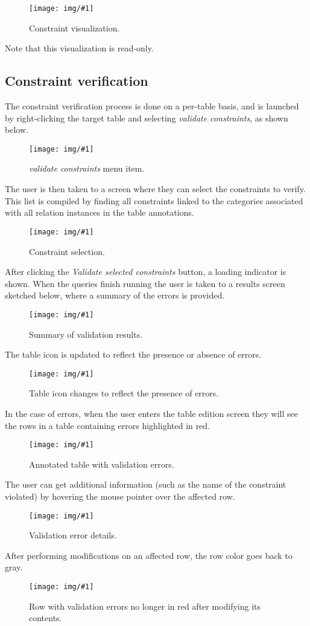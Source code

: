 \documentclass[a4paper, 10pt]{article}
\newcommand{\img}[3]{
  \begin{figure}[H]
    \begin{center}
      \texttt{[image: img/\#1]}
      \caption{#2}
    \end{center}
  \end{figure}
}
\begin{document}
\img{constraint-visualization.png}{Constraint visualization.}{12cm}

Note that this visualization is read-only.

\subsection{Constraint verification}

The constraint verification process is done on a per-table basis, and is
launched by right-clicking the target table and selecting \textit{validate
constraints}, as shown below.

\img{validate-constraints-menu-item.png}{
  \textit{validate constraints} menu item.
}{5cm}

The user is then taken to a screen where they can select the constraints to
verify. This list is compiled by finding all constraints linked to the
categories associated with all relation instances in the table annotations.

\img{constraint-selection.png}{Constraint selection.}{12cm}

After clicking the \textit{Validate selected constraints} button, a loading
indicator is shown. When the queries finish running the user is taken to a
results screen sketched below, where a summary of the errors is provided.

\img{validation-results-summary.png}{Summary of validation results.}{8cm}

The table icon is updated to reflect the presence or absence of errors.

\img{table-pin-error.png}{
  Table icon changes to reflect the presence of errors.
}{5cm}

In the case of errors, when the user enters the table edition screen they will
see the rows in a table containing errors highlighted in red.

\img{edit-annotation.png}{Annotated table with validation errors.}{12cm}

The user can get additional information (such as the name of the constraint
violated) by hovering the mouse pointer over the affected row.

\img{validation-results-details.png}{Validation error details.}{12cm}

After performing modifications on an affected row, the row color goes back to
gray.

\img{validation-results-after-modifications.png}{
  Row with validation errors no longer in red after modifying its contents.
}{12cm}
\end{document}
